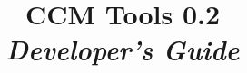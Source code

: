 \documentclass{book}
\begin{document}
\title{
\vspace{1cm} {\Huge CCM Tools 0.2} \\
\vspace{1cm} {\Huge \it Developer's Guide} \\
\vspace{1cm}{\it Leif M. Johnson, Egon Teiniker}\\
\vspace{0.5cm} {\small }}


\maketitle
\tableofcontents








\begin{appendix}

\end{appendix}




\end{document}
